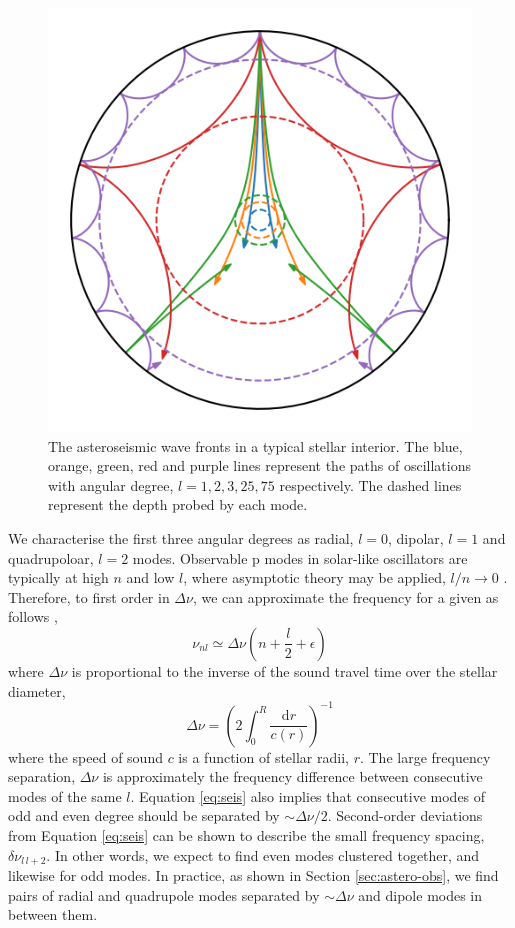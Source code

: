 \begin{figure}[ht]
    \centering
    \includegraphics[width=.5\linewidth]{introduction/images/seismo_wavefronts.png}
    \caption{The asteroseismic wave fronts in a typical stellar interior. The blue, orange, green, red and purple lines represent the paths of oscillations with angular degree, $l=1,2,3,25,75$ respectively. The dashed lines represent the depth probed by each mode.}
    \label{fig:waves}
\end{figure}

We characterise the first three angular degrees as radial, $l=0$, dipolar, $l=1$ and quadrupoloar, $l=2$ modes. Observable p modes in solar-like oscillators are typically at high $n$ and low $l$, where asymptotic theory may be applied, $l/n \rightarrow 0$ \citep{Tassoul1980}. Therefore, to first order in $\Delta\nu$, we can approximate the frequency for a given as follows \citep{Christensen-Dalsgaard1984},
%
\begin{equation}
    \nu_{nl} \simeq \Delta \nu\left(n+ \frac{l}{2} + \epsilon\right)\label{eq:seis}
\end{equation}
%
where $\Delta\nu$ is proportional to the inverse of the sound travel time over the stellar diameter,
%
\begin{equation}
    \Delta \nu = \left(2 \int_{0}^{R} \frac{\mathrm{d} r}{c(r)}\right)^{-1}
    \label{eq:dnu}
\end{equation}
%
where the speed of sound $c$ is a function of stellar radii, $r$. The large frequency separation, $\Delta\nu$ is approximately the frequency difference between consecutive modes of the same $l$. Equation \ref{eq:seis} also implies that consecutive modes of odd and even degree should be separated by $\sim \Delta \nu / 2$. Second-order deviations from Equation \ref{eq:seis} can be shown to describe the small frequency spacing, $\delta \nu_{l\,l+2}$. In other words, we expect to find even modes clustered together, and likewise for odd modes. In practice, as shown in Section \ref{sec:astero-obs}, we find pairs of radial and quadrupole modes separated by $\sim \Delta\nu$ and dipole modes in between them.

